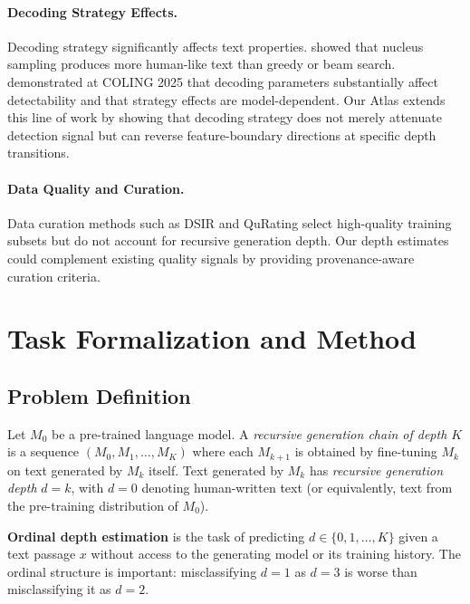 \documentclass[11pt,a4paper]{article}
\begin{document}
\paragraph{Decoding Strategy Effects.}
Decoding strategy significantly affects text properties.
\citet{holtzman2020curious} showed that nucleus sampling produces more human-like text than greedy or beam search.
\citet{garcesarias2025detection} demonstrated at COLING 2025 that decoding parameters substantially affect detectability and that strategy effects are model-dependent.
Our Atlas extends this line of work by showing that decoding strategy does not merely attenuate detection signal but can reverse feature-boundary directions at specific depth transitions.

\paragraph{Data Quality and Curation.}
Data curation methods such as DSIR \citep{xie2023data} and QuRating \citep{wettig2024qurating} select high-quality training subsets but do not account for recursive generation depth.
Our depth estimates could complement existing quality signals by providing provenance-aware curation criteria.

\section{Task Formalization and Method}
\label{sec:method}

\subsection{Problem Definition}

Let $M_0$ be a pre-trained language model.
A \emph{recursive generation chain of depth $K$} is a sequence $(M_0, M_1, \ldots, M_K)$ where each $M_{k+1}$ is obtained by fine-tuning $M_k$ on text generated by $M_k$ itself.
Text generated by $M_k$ has \emph{recursive generation depth} $d = k$, with $d = 0$ denoting human-written text (or equivalently, text from the pre-training distribution of $M_0$).

\textbf{Ordinal depth estimation} is the task of predicting $d \in \{0, 1, \ldots, K\}$ given a text passage $x$ without access to the generating model or its training history.
The ordinal structure is important: misclassifying $d{=}1$ as $d{=}3$ is worse than misclassifying it as $d{=}2$.
\end{document}
